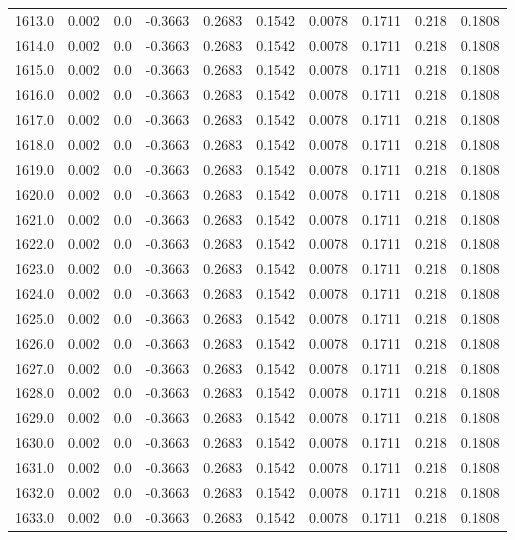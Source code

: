 \begin{longtable}{lrrrrrrrrr}
1613.0 & 0.002 & 0.0 & -0.3663 & 0.2683 & 0.1542 & 0.0078 & 0.1711 & 0.218 & 0.1808 \\
1614.0 & 0.002 & 0.0 & -0.3663 & 0.2683 & 0.1542 & 0.0078 & 0.1711 & 0.218 & 0.1808 \\
1615.0 & 0.002 & 0.0 & -0.3663 & 0.2683 & 0.1542 & 0.0078 & 0.1711 & 0.218 & 0.1808 \\
1616.0 & 0.002 & 0.0 & -0.3663 & 0.2683 & 0.1542 & 0.0078 & 0.1711 & 0.218 & 0.1808 \\
1617.0 & 0.002 & 0.0 & -0.3663 & 0.2683 & 0.1542 & 0.0078 & 0.1711 & 0.218 & 0.1808 \\
1618.0 & 0.002 & 0.0 & -0.3663 & 0.2683 & 0.1542 & 0.0078 & 0.1711 & 0.218 & 0.1808 \\
1619.0 & 0.002 & 0.0 & -0.3663 & 0.2683 & 0.1542 & 0.0078 & 0.1711 & 0.218 & 0.1808 \\
1620.0 & 0.002 & 0.0 & -0.3663 & 0.2683 & 0.1542 & 0.0078 & 0.1711 & 0.218 & 0.1808 \\
1621.0 & 0.002 & 0.0 & -0.3663 & 0.2683 & 0.1542 & 0.0078 & 0.1711 & 0.218 & 0.1808 \\
1622.0 & 0.002 & 0.0 & -0.3663 & 0.2683 & 0.1542 & 0.0078 & 0.1711 & 0.218 & 0.1808 \\
1623.0 & 0.002 & 0.0 & -0.3663 & 0.2683 & 0.1542 & 0.0078 & 0.1711 & 0.218 & 0.1808 \\
1624.0 & 0.002 & 0.0 & -0.3663 & 0.2683 & 0.1542 & 0.0078 & 0.1711 & 0.218 & 0.1808 \\
1625.0 & 0.002 & 0.0 & -0.3663 & 0.2683 & 0.1542 & 0.0078 & 0.1711 & 0.218 & 0.1808 \\
1626.0 & 0.002 & 0.0 & -0.3663 & 0.2683 & 0.1542 & 0.0078 & 0.1711 & 0.218 & 0.1808 \\
1627.0 & 0.002 & 0.0 & -0.3663 & 0.2683 & 0.1542 & 0.0078 & 0.1711 & 0.218 & 0.1808 \\
1628.0 & 0.002 & 0.0 & -0.3663 & 0.2683 & 0.1542 & 0.0078 & 0.1711 & 0.218 & 0.1808 \\
1629.0 & 0.002 & 0.0 & -0.3663 & 0.2683 & 0.1542 & 0.0078 & 0.1711 & 0.218 & 0.1808 \\
1630.0 & 0.002 & 0.0 & -0.3663 & 0.2683 & 0.1542 & 0.0078 & 0.1711 & 0.218 & 0.1808 \\
1631.0 & 0.002 & 0.0 & -0.3663 & 0.2683 & 0.1542 & 0.0078 & 0.1711 & 0.218 & 0.1808 \\
1632.0 & 0.002 & 0.0 & -0.3663 & 0.2683 & 0.1542 & 0.0078 & 0.1711 & 0.218 & 0.1808 \\
1633.0 & 0.002 & 0.0 & -0.3663 & 0.2683 & 0.1542 & 0.0078 & 0.1711 & 0.218 & 0.1808 \\

\end{longtable}
